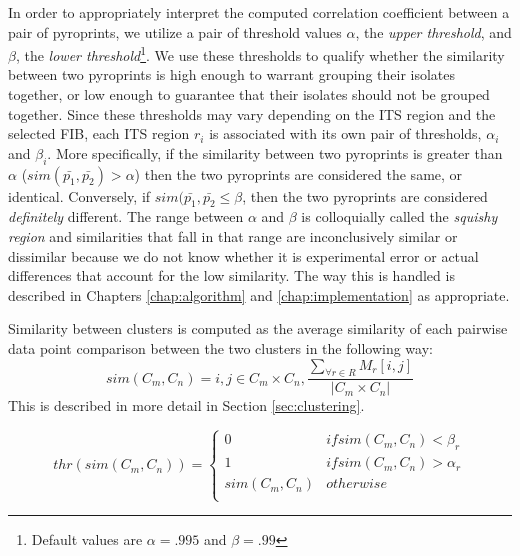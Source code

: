 \documentclass[12pt]{ucthesis}
\begin{document}
      In order to appropriately interpret the computed correlation coefficient
      between a pair of pyroprints, we utilize a pair of threshold values
      $\alpha$, the \textit{upper threshold}, and $\beta$, the \textit{lower
      threshold}\footnote{Default values are $\alpha = .995$ and $\beta =
      .99$}. We use these thresholds to qualify whether the
      similarity between two pyroprints is high enough to warrant grouping
      their isolates together, or low enough to guarantee that their isolates
      should not be grouped together. Since these thresholds may vary depending
      on the ITS region and the selected FIB, each ITS region
      $r_i$ is associated with its own pair of thresholds, $\alpha_i$ and $\beta_i$.
      More specifically, if the similarity between two pyroprints is greater
      than $\alpha$ ($sim(\bar{p_1}, \bar{p_2}) > \alpha$) then the two
      pyroprints are considered the same, or identical. Conversely, if
      $sim(\bar{p_1}, \bar{p_2} \le \beta$, then the two pyroprints are
      considered \textit{definitely} different. The range between $\alpha$ and
      $\beta$ is colloquially called the \textit{squishy region} and
      similarities that fall in that range are inconclusively similar or
      dissimilar because we do not know whether it is experimental error or
      actual differences that account for the low similarity. The way this is
      handled is described in Chapters \ref{chap:algorithm} and
      \ref{chap:implementation} as appropriate.

      Similarity between clusters is computed as the average similarity of each
      pairwise data point comparison between the two clusters in the following
      way:
      $$
         sim(C_m, C_n) = i,j \in C_m \times C_n, \frac{\sum_{\forall r \in
         R}M_r[i,j]} {|C_m \times C_n|}
      $$
      This is described in more detail in Section \ref{sec:clustering}.

      \begin{equation}\label{eq:threshold}
         thr(sim(C_m, C_n)) = \begin{cases}
                              0 & if sim(C_m, C_n) < \beta_r \\
                              1 & if sim(C_m, C_n) > \alpha_r \\
                              sim(C_m, C_n) & otherwise \\
                              \end{cases}
      \end{equation}
\end{document}
